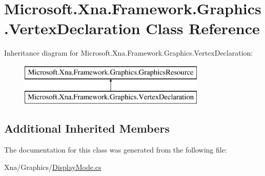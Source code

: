 \hypertarget{class_microsoft_1_1_xna_1_1_framework_1_1_graphics_1_1_vertex_declaration}{}\section{Microsoft.\+Xna.\+Framework.\+Graphics.\+Vertex\+Declaration Class Reference}
\label{class_microsoft_1_1_xna_1_1_framework_1_1_graphics_1_1_vertex_declaration}
Inheritance diagram for Microsoft.\+Xna.\+Framework.\+Graphics.\+Vertex\+Declaration\+:\begin{figure}[H]
\begin{center}
\leavevmode
\includegraphics[height=2.000000cm]{class_microsoft_1_1_xna_1_1_framework_1_1_graphics_1_1_vertex_declaration}
\end{center}
\end{figure}
\subsection*{Additional Inherited Members}


The documentation for this class was generated from the following file\+:\begin{DoxyCompactItemize}
\item 
Xna/\+Graphics/\hyperlink{_display_mode_8cs}{Display\+Mode.\+cs}\end{DoxyCompactItemize}
